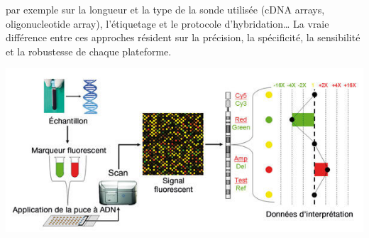 \documentclass[a4paper,10pt]{article}
\begin{document}
par exemple sur la longueur et la type de la sonde utilisée (cDNA arrays, oligonucleotide array), l’étiquetage et le protocole d’hybridation…
La vraie différence entre ces approches résident sur la précision, la spécificité, la sensibilité et la robustesse de chaque plateforme.
\begin{center}
 \includegraphics[scale=0.5]{./image/principe.jpg}
\end{center}
\end{document}
